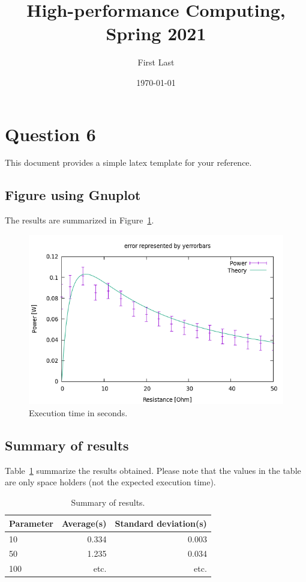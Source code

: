 \documentclass[12pt]{article}
\title{High-performance Computing, Spring 2021}
\author{First Last}
\date{\today}
\begin{document}
\maketitle

\section*{Question 6}

This document provides a simple latex template for your reference.

\subsection*{Figure using Gnuplot}

The results are summarized in Figure~\ref{fig:exectime}.

\begin{figure}[h!]
  \centering
  \includegraphics[width=0.9\linewidth]{errorbars1.png}
  \caption{Execution time in seconds.}
  \label{fig:exectime}
\end{figure}

\subsection*{Summary of results}

Table~\ref{tab:results} summarize the results obtained. Please note that the values in the table are only space holders (not the expected execution time).

\begin{table}[h!]
  \centering
    \begin{tabular}{||l r r||} 
    \hline
    Parameter & Average(s) & Standard deviation(s) \\ [0.5ex] 
    \hline
    \hline
    10 & 0.334 & 0.003 \\ 
    50 & 1.235 & 0.034 \\
    100 & etc. & etc. \\
    \hline
    \end{tabular}
  \caption{Summary of results.}
  \label{tab:results}
\end{table}
\end{document}
